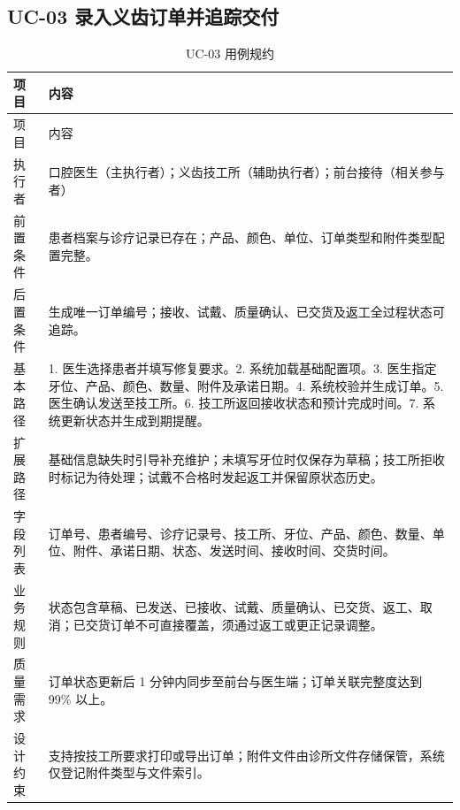 \documentclass[UTF8,a4paper,12pt,fontset=fandol]{ctexart}
\begin{document}
\subsection{UC-03 录入义齿订单并追踪交付}
\begin{longtable}{L{3.1cm}Z}
\caption{UC-03 用例规约}\label{tab:uc03}\\
\toprule 项目 & 内容 \\ \midrule
\endfirsthead
\toprule 项目 & 内容 \\ \midrule
\endhead
执行者 & 口腔医生（主执行者）；义齿技工所（辅助执行者）；前台接待（相关参与者） \\
前置条件 & 患者档案与诊疗记录已存在；产品、颜色、单位、订单类型和附件类型配置完整。 \\
后置条件 & 生成唯一订单编号；接收、试戴、质量确认、已交货及返工全过程状态可追踪。 \\
基本路径 & 1. 医生选择患者并填写修复要求。2. 系统加载基础配置项。3. 医生指定牙位、产品、颜色、数量、附件及承诺日期。4. 系统校验并生成订单。5. 医生确认发送至技工所。6. 技工所返回接收状态和预计完成时间。7. 系统更新状态并生成到期提醒。 \\
扩展路径 & 基础信息缺失时引导补充维护；未填写牙位时仅保存为草稿；技工所拒收时标记为待处理；试戴不合格时发起返工并保留原状态历史。 \\
字段列表 & 订单号、患者编号、诊疗记录号、技工所、牙位、产品、颜色、数量、单位、附件、承诺日期、状态、发送时间、接收时间、交货时间。 \\
业务规则 & 状态包含草稿、已发送、已接收、试戴、质量确认、已交货、返工、取消；已交货订单不可直接覆盖，须通过返工或更正记录调整。 \\
质量需求 & 订单状态更新后 1 分钟内同步至前台与医生端；订单关联完整度达到 99\% 以上。 \\
设计约束 & 支持按技工所要求打印或导出订单；附件文件由诊所文件存储保管，系统仅登记附件类型与文件索引。 \\
\bottomrule
\end{longtable}

\end{document}
